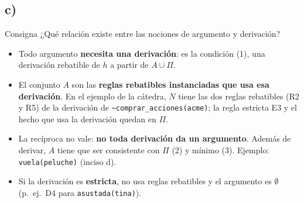 \documentclass[11pt,a4paper]{article}
\newcommand{\nf}{\textasciitilde}                 %
\begin{document}
\subsection{c)}

\begin{enunciado}{Consigna}
¿Qué relación existe entre las nociones de argumento y derivación?
\end{enunciado}

\begin{itemize}
  \item Todo argumento \textbf{necesita una derivación}: es la condición (1), una derivación rebatible de $h$ a partir de $A \cup \Pi$.
  \item El conjunto $A$ son las \textbf{reglas rebatibles instanciadas que usa esa derivación}. En el ejemplo de la cátedra, $N$ tiene las dos reglas rebatibles (R2 y R5) de la derivación de \texttt{\nf comprar\_acciones(acme)}; la regla estricta E3 y el hecho que usa la derivación quedan en $\Pi$.
  \item La recíproca no vale: \textbf{no toda derivación da un argumento}. Además de derivar, $A$ tiene que ser consistente con $\Pi$ (2) y mínimo (3). Ejemplo: \texttt{vuela(peluche)} (inciso d).
  \item Si la derivación es \textbf{estricta}, no usa reglas rebatibles y el argumento es $\emptyset$ (p.~ej.\ D4 para \texttt{asustada(tina)}).
\end{itemize}

\begin{center}
\end{center}
\end{document}
